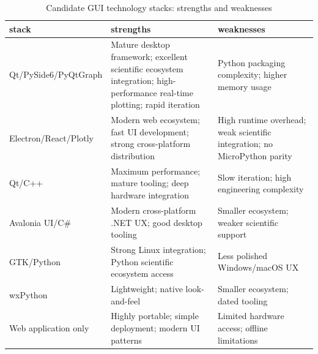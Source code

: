 \documentclass[10pt, a4paper]{article}
\begin{document}
\begin{table}[H]
  \small
  \centering
  \caption{Candidate GUI technology stacks: strengths and weaknesses}
  \label{tab:candidates}
  \begin{tabularx}{\textwidth}{lXX}
    \toprule
    stack                 & strengths                                                                                                                  & weaknesses                                                                \\
    \midrule
    Qt/PySide6/PyQtGraph  & Mature desktop framework; excellent scientific ecosystem integration; high-performance real-time plotting; rapid iteration & Python packaging complexity; higher memory usage                          \\
    Electron/React/Plotly & Modern web ecosystem; fast UI development; strong cross-platform distribution                                              & High runtime overhead; weak scientific integration; no MicroPython parity \\
    Qt/C++                & Maximum performance; mature tooling; deep hardware integration                                                             & Slow iteration; high engineering complexity                               \\
    Avalonia UI/C\#       & Modern cross-platform .NET UX; good desktop tooling                                                                        & Smaller ecosystem; weaker scientific support                              \\
    GTK/Python            & Strong Linux integration; Python scientific ecosystem access                                                               & Less polished Windows/macOS UX                                            \\
    wxPython              & Lightweight; native look-and-feel                                                                                          & Smaller ecosystem; dated tooling                                          \\
    Web application only  & Highly portable; simple deployment; modern UI patterns                                                                     & Limited hardware access; offline limitations                              \\
    \bottomrule
  \end{tabularx}
\end{table}
\end{document}
